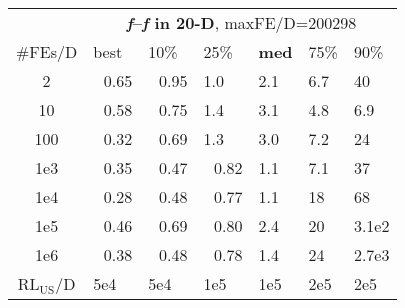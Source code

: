 \begin{tabular}{c|llllll}
 & \multicolumn{6}{|c}{\textbf{\textit{f}\raisebox{-0.35ex}{1}--\textit{f}\raisebox{-0.35ex}{24} in 20-D}, maxFE/D=200298}\\
\#FEs/D & best & 10\% & 25\% & \textbf{med} & 75\% & 90\%\\
2 & ~\,0.65 & ~\,0.95 & \hspace*{1ex}1.0 & \hspace*{1ex}2.1 & \hspace*{1ex}6.7 & 40\\
10 & ~\,0.58 & ~\,0.75 & \hspace*{1ex}1.4 & \hspace*{1ex}3.1 & \hspace*{1ex}4.8 & \hspace*{1ex}6.9\\
100 & ~\,0.32 & ~\,0.69 & \hspace*{1ex}1.3 & \hspace*{1ex}3.0 & \hspace*{1ex}7.2 & 24\\
1e3 & ~\,0.35 & ~\,0.47 & ~\,0.82 & \hspace*{1ex}1.1 & \hspace*{1ex}7.1 & 37\\
1e4 & ~\,0.28 & ~\,0.48 & ~\,0.77 & \hspace*{1ex}1.1 & 18 & 68\\
1e5 & ~\,0.46 & ~\,0.69 & ~\,0.80 & \hspace*{1ex}2.4 & 20 & 3.1e2\\
1e6 & ~\,0.38 & ~\,0.48 & ~\,0.78 & \hspace*{1ex}1.4 & 24 & 2.7e3\\
$\text{RL}_{\text{US}}$/D & 5e4 & 5e4 & 1e5 & 1e5 & 2e5 & 2e5
\end{tabular}

